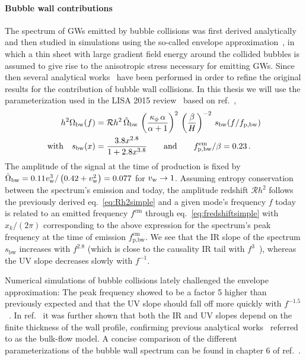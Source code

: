 \paragraph{Bubble wall contributions}
The spectrum of \acp{GW} emitted by bubble collisions was first derived analytically and then studied in simulations using the so-called envelope approximation~\cite{Kamionkowski:1993fg, Kosowsky:1992vn, Kosowsky:1991ua}, in which a thin sheet with large gradient field energy around the collided bubbles is assumed to give rise to the anisotropic stress necessary for emitting \acp{GW}. Since then several analytical works~\cite{Jinno:2016vai, Caprini:2007xq, Huber:2008hg, Weir:2016tov, Konstandin:2017sat} have been performed in order  to refine the original results for the contribution of bubble wall collisions. In this thesis we will use the parameterization used in the \ac{LISA} 2015 review~\cite{Caprini:2015zlo} based on ref.~\cite{Huber:2008hg},
\begin{align}
	h^2 \Omega_\text{bw}(f) &= \mathcal{R}h^2 \, \tilde{\Omega}_{\text{bw}} \,  \left( \frac{\kappa_\phi\, \alpha}{\alpha + 1} \right)^2 \, \left( \frac{\beta}{H} \right)^{-2} \, s_{\text{bw}}(f/f_\text{p,\ensuremath{\text{bw}}}) \nonumber \\
	\text{with} \quad s_{\text{bw}}(x) &= \frac{3.8 x^{2.8}}{1 + 2.8 x^{3.8}} \qquad \text{and} \qquad f^\text{em}_\text{p,bw} / \beta = 0.23 \, . \label{eq:bw}
\end{align}
The amplitude of the signal at the time of production is fixed by $\tilde{\Omega}_\text{bw} = {0.11 v_\mathrm{w}^3} / \left( 0.42 + v_\mathrm{w}^2 \right) = 0.077$ for $v_\mathrm{w} \rightarrow 1$. Assuming entropy conservation between the spectrum's emission and today, the amplitude redshift $\mathcal{R}h^2$ follows the previously derived eq.~\eqref{eq:Rh2simple} and a given mode's frequency $f$ today is related to an emitted frequency $f^\text{em}$ through eq.~\eqref{eq:fredshiftsimple} with $x_k/(2 \pi)$ corresponding to the above expression for the spectrum's peak frequency at the time of emission $f_\text{p,bw}^\text{em}$. We see that the \ac{IR} slope of the spectrum $s_\text{bw}$ increases with $f^{2.8}$ (which is close to the causality \ac{IR} tail with $f^3$~\cite{Durrer:2003ja, Caprini:2009fx, Cai:2019cdl, Hook:2020phx}), whereas the \ac{UV} slope decreases slowly with $f^{-1}$.

Numerical  simulations of bubble collisions lately challenged the envelope approximation: The peak frequency showed to be a factor 5 higher than previously expected and that the \ac{UV} slope should fall off more quickly with $f^{-1.5}$~\cite{Cutting:2018tjt}. In ref.~\cite{Cutting:2020nla} it was further shown that both the \ac{IR} and \ac{UV} slopes depend on the finite thickness of the wall profile, confirming previous analytical works~\cite{Jinno:2017fby, Konstandin:2017sat} referred to as the bulk-flow model. A concise comparison of the different parameterizations of the bubble wall spectrum can be found in chapter 6 of ref.~\cite{Gouttenoire:2022gwi}.


